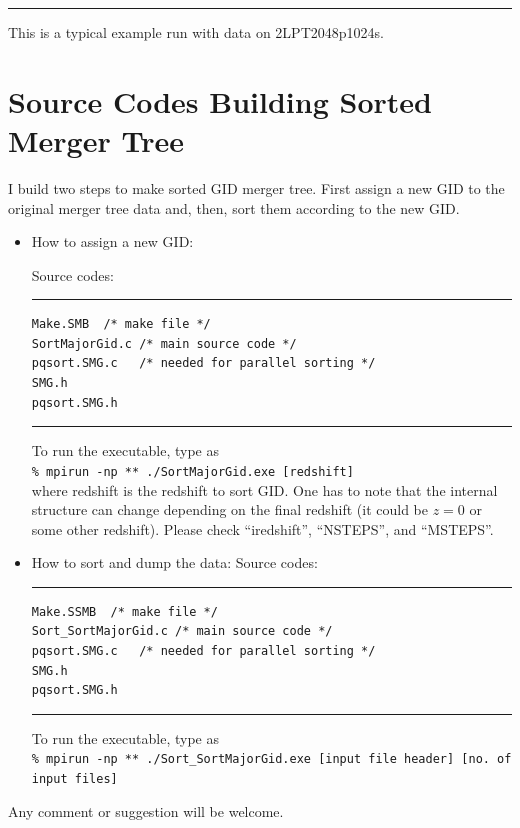 \documentclass[openleft]{memoir}
\begin{document}
\noindent\rule{\textwidth}{1pt}
This is a typical example run with data on 2LPT2048p1024s.


\section{Source Codes Building Sorted Merger Tree}
I build two steps to make sorted GID merger tree.
First assign a new GID to the original merger tree data and, then, sort them according to the new GID.

\begin{itemize}
\item How to assign a new GID:

Source codes:\\
\noindent\rule{\textwidth}{1pt}
\begin{lstlisting}
Make.SMB  /* make file */
SortMajorGid.c /* main source code */
pqsort.SMG.c   /* needed for parallel sorting */
SMG.h
pqsort.SMG.h
\end{lstlisting}
\noindent\rule{\textwidth}{1pt}
To run the executable, type as\\
\texttt{\% mpirun -np ** ./SortMajorGid.exe [redshift]}\\
where redshift is the redshift to sort GID.
One has to note that the internal structure can change depending on the final redshift (it could be $z=0$ or some
other redshift). Please check ``iredshift'', ``NSTEPS'', and ``MSTEPS''.

\item How to sort and dump the data:
Source codes:\\
\noindent\rule{\textwidth}{1pt} 
\begin{lstlisting}
Make.SSMB  /* make file */
Sort_SortMajorGid.c /* main source code */
pqsort.SMG.c   /* needed for parallel sorting */
SMG.h
pqsort.SMG.h
\end{lstlisting}
\noindent\rule{\textwidth}{1pt}
To run the executable, type as\\
\texttt{\% mpirun -np ** ./Sort\_SortMajorGid.exe [input file header] [no. of input files]}\\


\end{itemize}

Any comment or suggestion will be welcome.
\end{document}

